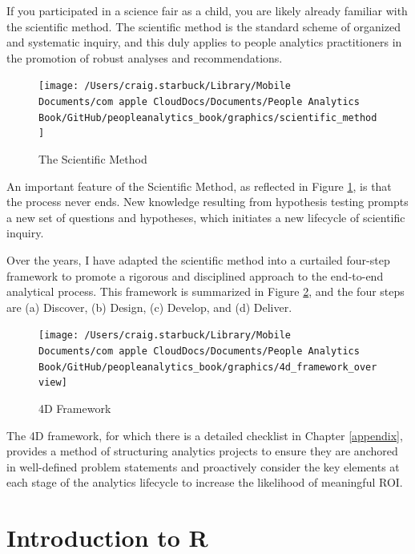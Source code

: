 \documentclass[
]{book}
\begin{document}
If you participated in a science fair as a child, you are likely already familiar with the scientific method. The scientific method is the standard scheme of organized and systematic inquiry, and this duly applies to people analytics practitioners in the promotion of robust analyses and recommendations.

\begin{figure}

{\centering \texttt{[image: /Users/craig.starbuck/Library/Mobile Documents/com~apple~CloudDocs/Documents/People Analytics Book/GitHub/peopleanalytics\_book/graphics/scientific\_method]} 

}

\caption{The Scientific Method}\label{fig:sci-method}
\end{figure}

An important feature of the Scientific Method, as reflected in Figure \ref{fig:sci-method}, is that the process never ends. New knowledge resulting from hypothesis testing prompts a new set of questions and hypotheses, which initiates a new lifecycle of scientific inquiry.

Over the years, I have adapted the scientific method into a curtailed four-step framework to promote a rigorous and disciplined approach to the end-to-end analytical process. This framework is summarized in Figure \ref{fig:4d-framework}, and the four steps are (a) Discover, (b) Design, (c) Develop, and (d) Deliver.

\begin{figure}

{\centering \texttt{[image: /Users/craig.starbuck/Library/Mobile Documents/com~apple~CloudDocs/Documents/People Analytics Book/GitHub/peopleanalytics\_book/graphics/4d\_framework\_overview]} 

}

\caption{4D Framework}\label{fig:4d-framework}
\end{figure}

The 4D framework, for which there is a detailed checklist in Chapter \ref{appendix}, provides a method of structuring analytics projects to ensure they are anchored in well-defined problem statements and proactively consider the key elements at each stage of the analytics lifecycle to increase the likelihood of meaningful ROI.

\hypertarget{r-intro}{%
\chapter{Introduction to R}\label{r-intro}}
\end{document}
